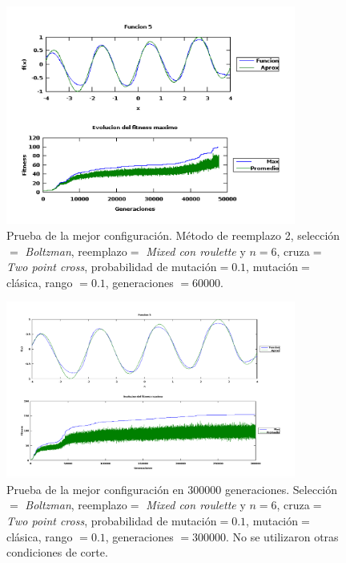 \documentclass[11pt,a4paper]{article}
\begin{document}
\begin{figure}[h]
\centering
\includegraphics[width=0.85\textwidth]{img/mejor-config-corto-100.png}
\caption{\label{fig:mejor-corto-100} Prueba de la mejor configuración. Método de reemplazo 2, selección$=$ \emph{Boltzman}, reemplazo$=$ \emph{Mixed con roulette} y $n=6$, cruza$=$ \emph{Two point cross}, probabilidad de mutación$=0.1$, mutación$=$ clásica, rango $=0.1$, generaciones $= 60000$.}
\end{figure}


\begin{figure}[h]
\centering
\includegraphics[width=0.85\textwidth]{img/mejor-config-300000-gen.png}
\caption{\label{fig:mejor-300000} Prueba de la mejor configuración en $300000$ generaciones. Selección$=$ \emph{Boltzman}, reemplazo$=$ \emph{Mixed con roulette} y $n=6$, cruza$=$ \emph{Two point cross}, probabilidad de mutación$=0.1$, mutación$=$ clásica, rango $=0.1$, generaciones $= 300000$. No se utilizaron otras condiciones de corte.}
\end{figure}
\end{document}
